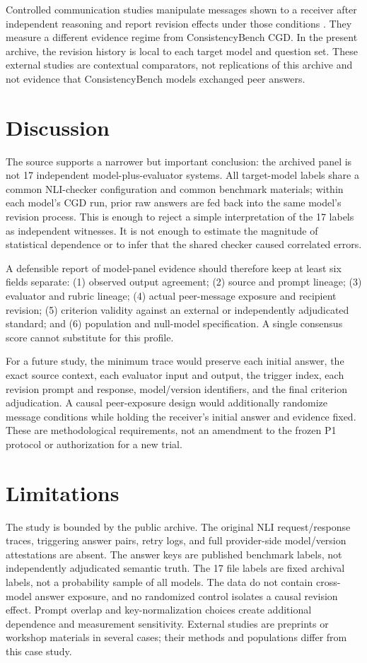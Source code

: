 \documentclass[11pt]{article}
\begin{document}
Controlled communication studies manipulate messages shown to a receiver after independent reasoning and report revision effects under those conditions \cite{Li2026,Gong2026}. They measure a different evidence regime from ConsistencyBench CGD. In the present archive, the revision history is local to each target model and question set. These external studies are contextual comparators, not replications of this archive and not evidence that ConsistencyBench models exchanged peer answers.

\section{Discussion}
The source supports a narrower but important conclusion: the archived panel is not 17 independent model-plus-evaluator systems. All target-model labels share a common NLI-checker configuration and common benchmark materials; within each model's CGD run, prior raw answers are fed back into the same model's revision process. This is enough to reject a simple interpretation of the 17 labels as independent witnesses. It is not enough to estimate the magnitude of statistical dependence or to infer that the shared checker caused correlated errors.

A defensible report of model-panel evidence should therefore keep at least six fields separate: (1) observed output agreement; (2) source and prompt lineage; (3) evaluator and rubric lineage; (4) actual peer-message exposure and recipient revision; (5) criterion validity against an external or independently adjudicated standard; and (6) population and null-model specification. A single consensus score cannot substitute for this profile.

For a future study, the minimum trace would preserve each initial answer, the exact source context, each evaluator input and output, the trigger index, each revision prompt and response, model/version identifiers, and the final criterion adjudication. A causal peer-exposure design would additionally randomize message conditions while holding the receiver's initial answer and evidence fixed. These are methodological requirements, not an amendment to the frozen P1 protocol or authorization for a new trial.

\section{Limitations}
The study is bounded by the public archive. The original NLI request/response traces, triggering answer pairs, retry logs, and full provider-side model/version attestations are absent. The answer keys are published benchmark labels, not independently adjudicated semantic truth. The 17 file labels are fixed archival labels, not a probability sample of all models. The data do not contain cross-model answer exposure, and no randomized control isolates a causal revision effect. Prompt overlap and key-normalization choices create additional dependence and measurement sensitivity. External studies are preprints or workshop materials in several cases; their methods and populations differ from this case study.
\end{document}
